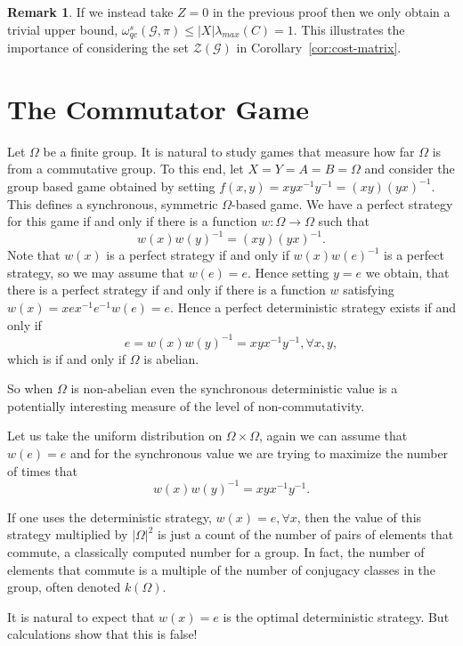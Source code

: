 \documentclass[11pt]{amsart}
\theoremstyle{definition}
\newtheorem{remark}[thm]{Remark}
\newcommand{\cl}[1]{\mathcal{#1}}
\begin{document}
\begin{remark}
  If we instead take $Z=0$ in the previous proof then we only obtain a trivial
  upper bound, $\omega_{qc}^s(\cl G,\pi)\le
  |X|\lambda_{max}(C)=1$. This illustrates the importance of considering the set
  $\cl Z(\cl G)$ in Corollary~\ref{cor:cost-matrix}.
\end{remark}

 \section{The Commutator Game}

 Let $\Omega$ be a finite group.  It is natural to study games that measure how far $\Omega$ is from a commutative group. To this end, let $X = Y = A = B =\Omega$ and consider the group based game obtained by setting $f(x,y) = xyx^{-1}y^{-1} = (xy)(yx)^{-1}$. This defines a synchronous, symmetric $\Omega$-based game. We have a perfect strategy for this game if and only if there is a function $w: \Omega \to \Omega$ such that
 \[ w(x) w(y)^{-1} = (xy)(yx)^{-1}.\]
 Note that $w(x)$ is a perfect strategy if and only if $w(x) w(e)^{-1}$ is a perfect strategy, so we may assume that $w(e) =e$.
 Hence
 setting $y=e$ we obtain, that there is a perfect strategy if and only if there is a function $w$ satisfying $w(x) = xex^{-1}e^{-1} w(e)=e$. Hence a perfect deterministic strategy exists if and only if
 \[ e= w(x)w(y)^{-1} = xyx^{-1} y^{-1}, \forall x,y,\]
 which is if and only if $\Omega$ is abelian.

 So when $\Omega$ is non-abelian even the synchronous deterministic value is a potentially interesting measure of the level of non-commutativity.

Let us take the uniform distribution on $\Omega \times \Omega$, again we can assume that $w(e) =e$ and for the synchronous value we are trying to maximize the number of times that
  \[ w(x)w(y)^{-1} = xyx^{-1} y^{-1}.\]

  If one uses the deterministic strategy, $w(x) = e, \forall x$, then the value of this strategy multiplied by $|\Omega|^2$ is just a count of the number of pairs of elements that commute, a classically computed number for a group. In fact, the number of elements that commute is a multiple of the number of conjugacy classes in the group, often denoted $k(\Omega)$.

  It is natural to expect that $w(x) =e$ is the optimal deterministic strategy.  But calculations show that this is false!
\end{document}

